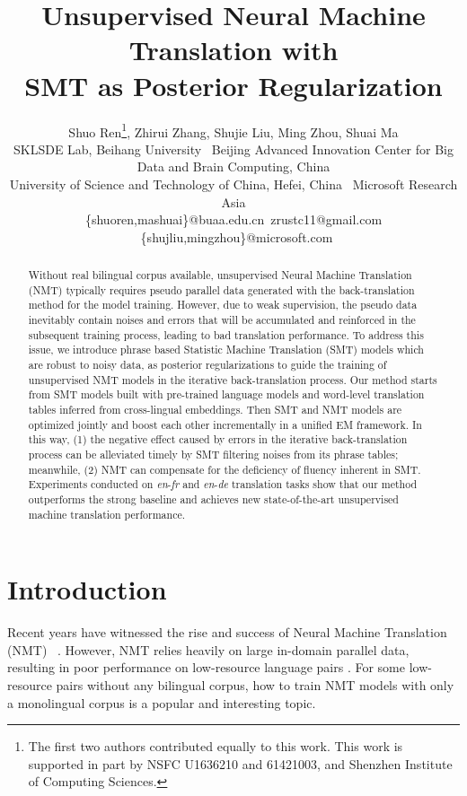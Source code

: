 \documentclass[letterpaper]{article} \usepackage{aaai19}  \usepackage{times}  \usepackage{helvet}  \usepackage{courier}  \usepackage{url}  \usepackage{graphicx}  \usepackage{amsmath}
\begin{document}
\title{Unsupervised Neural Machine Translation with \\
SMT as Posterior Regularization}
\author{Shuo Ren\thanks{The first two authors contributed equally to this work. This work is supported in part by NSFC U1636210 and 61421003, and Shenzhen Institute of Computing Sciences.}, Zhirui Zhang, Shujie Liu, Ming Zhou, Shuai Ma \\
SKLSDE Lab, Beihang University \ Beijing Advanced Innovation Center for Big Data and Brain Computing, China\\
University of Science and Technology of China, Hefei, China \ 
Microsoft Research Asia \\
\{shuoren,mashuai\}@buaa.edu.cn\ zrustc11@gmail.com \ 
\{shujliu,mingzhou\}@microsoft.com \\
}
\maketitle
\begin{abstract}
Without real bilingual corpus available, unsupervised Neural Machine Translation (NMT) typically requires pseudo parallel data generated with the back-translation method for the model training. 
However, due to weak supervision, the pseudo data inevitably contain noises and errors that will be accumulated and reinforced in the subsequent training process, leading to bad translation performance. 
To address this issue, we introduce phrase based Statistic Machine Translation (SMT) models which are robust to noisy data, as posterior regularizations to guide the training of unsupervised NMT models in the iterative back-translation process.
Our method starts from SMT models built with pre-trained language models and word-level translation tables inferred from cross-lingual embeddings. Then SMT and NMT models are optimized jointly and boost each other incrementally in a unified EM framework. 
In this way, (1) the negative effect caused by errors in the iterative back-translation process can be alleviated timely by SMT filtering noises from its phrase tables; meanwhile, (2) NMT can compensate for the deficiency of fluency inherent in SMT.
Experiments conducted on \emph{en}-\emph{fr} and \emph{en}-\emph{de} translation tasks show that our method outperforms the strong baseline and achieves new state-of-the-art unsupervised machine translation performance.
\end{abstract}

\section{Introduction}
\label{sec_introduction}
Recent years have witnessed the rise and success of Neural Machine Translation (NMT) ~\cite{sutskever2014sequence,bahdanau2014neural,luong2015effective,wu2016google,vaswani2017attention,hassan2018achieving}. However, NMT relies heavily on large in-domain parallel data, resulting in poor performance on low-resource language pairs \cite{koehn2017six}. 
For some low-resource pairs without any bilingual corpus, how to train NMT models with only a monolingual corpus is a popular and interesting topic.
\end{document}
